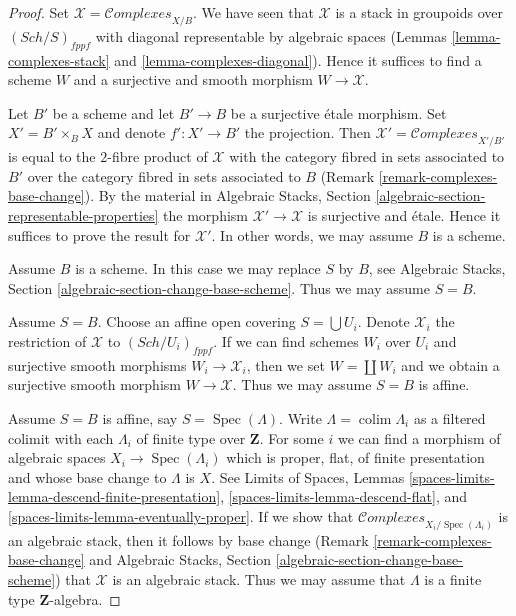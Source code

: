 \documentclass[10pt,a4paper]{amsart}
\theoremstyle{plain}
\theoremstyle{definition}
\theoremstyle{remark}
\numberwithin{equation}{subsection}
\def\colim{\mathop{\mathrm{colim}}\nolimits}
\def\Spec{\mathop{\mathrm{Spec}}}
\def\Sch{\mathit{Sch}}
\def\Complexesstack{\mathcal{C}\!\mathit{omplexes}}
\begin{document}
\begin{proof}
Set $\mathcal{X} = \Complexesstack_{X/B}$. We have seen that $\mathcal{X}$
is a stack in groupoids over $(\Sch/S)_{fppf}$ with diagonal representable
by algebraic spaces
(Lemmas \ref{lemma-complexes-stack} and \ref{lemma-complexes-diagonal}).
Hence it suffices to find a scheme $W$ and a surjective and smooth
morphism $W \to \mathcal{X}$.

\medskip\noindent
Let $B'$ be a scheme and let $B' \to B$ be a surjective \'etale morphism.
Set $X' = B' \times_B X$ and denote $f' : X' \to B'$ the projection.
Then $\mathcal{X}' = \Complexesstack_{X'/B'}$ is equal to the $2$-fibre
product of $\mathcal{X}$ with the category fibred in sets
associated to $B'$ over the category fibred in sets associated to $B$
(Remark \ref{remark-complexes-base-change}). By the material in
Algebraic Stacks, Section \ref{algebraic-section-representable-properties}
the morphism $\mathcal{X}' \to \mathcal{X}$ is surjective and \'etale.
Hence it suffices to prove the result for $\mathcal{X}'$.
In other words, we may assume $B$ is a scheme.

\medskip\noindent
Assume $B$ is a scheme. In this case we may replace $S$ by $B$, see
Algebraic Stacks, Section \ref{algebraic-section-change-base-scheme}.
Thus we may assume $S = B$.

\medskip\noindent
Assume $S = B$. Choose an affine open covering $S = \bigcup U_i$.
Denote $\mathcal{X}_i$ the restriction of $\mathcal{X}$ to
$(\Sch/U_i)_{fppf}$. If we can find schemes $W_i$ over $U_i$ and
surjective smooth morphisms $W_i \to \mathcal{X}_i$, then we
set $W = \coprod W_i$ and we obtain a surjective smooth morphism
$W \to \mathcal{X}$. Thus we may assume $S = B$ is affine.

\medskip\noindent
Assume $S = B$ is affine, say $S = \Spec(\Lambda)$.
Write $\Lambda = \colim \Lambda_i$ as a filtered colimit with each $\Lambda_i$
of finite type over $\mathbf{Z}$. For some $i$ we can find
a morphism of algebraic spaces $X_i \to \Spec(\Lambda_i)$
which is proper, flat, of finite presentation and whose base change
to $\Lambda$ is $X$. See Limits of Spaces, Lemmas
\ref{spaces-limits-lemma-descend-finite-presentation},
\ref{spaces-limits-lemma-descend-flat}, and
\ref{spaces-limits-lemma-eventually-proper}.
If we show that $\Complexesstack_{X_i/\Spec(\Lambda_i)}$ is an
algebraic stack, then it follows by base change
(Remark \ref{remark-complexes-base-change} and
Algebraic Stacks, Section \ref{algebraic-section-change-base-scheme})
that $\mathcal{X}$ is an algebraic stack.
Thus we may assume that $\Lambda$ is a finite type $\mathbf{Z}$-algebra.


\end{proof}
\end{document}
